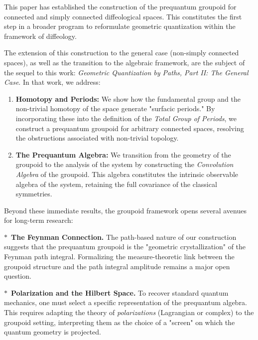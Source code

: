   \begin{article}
    \label{art:Future Directions}
    
    This paper has established the construction of the prequantum groupoid for connected and simply connected diffeological spaces.
    This constitutes the first step in a broader program to reformulate geometric quantization within the framework of diffeology.
    
    The extension of this construction to the general case (non-simply connected spaces),
    as well as the transition to the algebraic framework,
    are the subject of the sequel to this work:
    \emph{Geometric Quantization by Paths, Part II: The General Case}.
    In that work,
    we address:
    \begin{enumerate}
      \item \textbf{Homotopy and Periods:} We show how the fundamental group and the non-trivial homotopy of the space generate "surfacic periods."
      By incorporating these into the definition of the \emph{Total Group of Periods},
      we construct a prequantum groupoid for arbitrary connected spaces,
      resolving the obstructions associated with non-trivial topology.
      \item \textbf{The Prequantum Algebra:} We transition from the geometry of the groupoid to the analysis of the system by constructing the \emph{Convolution Algebra} of the groupoid.
      This algebra constitutes the intrinsic observable algebra of the system,
      retaining the full covariance of the classical symmetries.
    \end{enumerate}
    
    Beyond these immediate results,
    the groupoid framework opens several avenues for long-term research:
    
    $\ast$~\textbf{The Feynman Connection.}
    The path-based nature of our construction suggests that the prequantum groupoid is the "geometric crystallization" of the Feynman path integral.
    Formalizing the measure-theoretic link between the groupoid structure and the path integral amplitude remains a major open question.
    
    $\ast$~\textbf{Polarization and the Hilbert Space.}
    To recover standard quantum mechanics,
    one must select a specific representation of the prequantum algebra.
    This requires adapting the theory of \emph{polarizations} (Lagrangian or complex) to the groupoid setting,
    interpreting them as the choice of a "screen" on which the quantum geometry is projected.
    

\end{article}
